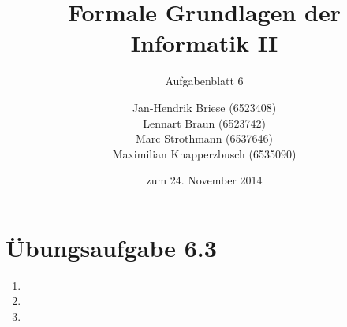 \documentclass[a4paper]{scrartcl}
\title{Formale Grundlagen der Informatik II}
\subtitle{Aufgabenblatt 6}
\author{
    Jan-Hendrik Briese (6523408) \\
    Lennart Braun (6523742) \\
    Marc Strothmann (6537646) \\
    Maximilian Knapperzbusch (6535090)
}
\date{zum 24. November 2014}
\begin{document}
\maketitle

\section*{Übungsaufgabe 6.3} 
\begin{enumerate}
    \item

    \item

    \item

\end{enumerate}
\end{document}
